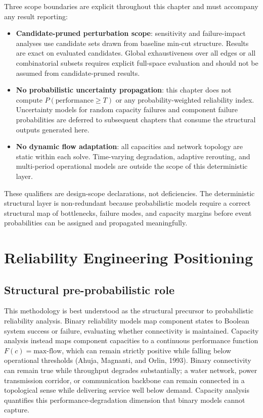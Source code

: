 \documentclass[12pt]{report}
\begin{document}
Three scope boundaries are explicit throughout this chapter and must accompany any result reporting:

\begin{itemize}
    \item \textbf{Candidate-pruned perturbation scope}: sensitivity and failure-impact analyses use candidate sets drawn from baseline min-cut structure. Results are exact on evaluated candidates. Global exhaustiveness over all edges or all combinatorial subsets requires explicit full-space evaluation and should not be assumed from candidate-pruned results.
    \item \textbf{No probabilistic uncertainty propagation}: this chapter does not compute $P(\text{performance}\ge T)$ or any probability-weighted reliability index. Uncertainty models for random capacity failures and component failure probabilities are deferred to subsequent chapters that consume the structural outputs generated here.
    \item \textbf{No dynamic flow adaptation}: all capacities and network topology are static within each solve. Time-varying degradation, adaptive rerouting, and multi-period operational models are outside the scope of this deterministic layer.
\end{itemize}

These qualifiers are design-scope declarations, not deficiencies. The deterministic structural layer is non-redundant because probabilistic models require a correct structural map of bottlenecks, failure modes, and capacity margins before event probabilities can be assigned and propagated meaningfully.

\section{Reliability Engineering Positioning}

\subsection{Structural pre-probabilistic role}

This methodology is best understood as the structural precursor to probabilistic reliability analysis. Binary reliability models map component states to Boolean system success or failure, evaluating whether connectivity is maintained. Capacity analysis instead maps component capacities to a continuous performance function $F(c) = \text{max-flow}$, which can remain strictly positive while falling below operational thresholds (Ahuja, Magnanti, and Orlin, 1993). Binary connectivity can remain true while throughput degrades substantially; a water network, power transmission corridor, or communication backbone can remain connected in a topological sense while delivering service well below demand. Capacity analysis quantifies this performance-degradation dimension that binary models cannot capture.
\end{document}

